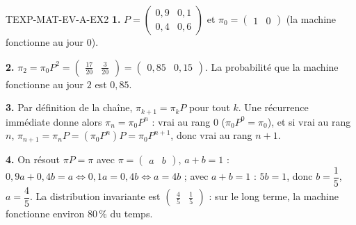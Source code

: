 \begin{corrige}{TEXP-MAT-EV-A-EX2}
\textbf{1.} $P=\begin{pmatrix}0{,}9&0{,}1\\0{,}4&0{,}6\end{pmatrix}$ et $\pi_0=\begin{pmatrix}1&0\end{pmatrix}$ (la machine fonctionne au jour $0$).

\textbf{2.} $\pi_2=\pi_0P^2=\begin{pmatrix}\tfrac{17}{20}&\tfrac{3}{20}\end{pmatrix}=\begin{pmatrix}0{,}85&0{,}15\end{pmatrix}$. La probabilité que la machine fonctionne au jour $2$ est $0{,}85$.

\textbf{3.} Par définition de la chaîne, $\pi_{k+1}=\pi_kP$ pour tout $k$. Une récurrence immédiate donne alors $\pi_n=\pi_0P^n$ : vrai au rang $0$ ($\pi_0P^0=\pi_0$), et si vrai au rang $n$, $\pi_{n+1}=\pi_nP=(\pi_0P^n)P=\pi_0P^{n+1}$, donc vrai au rang $n+1$.

\textbf{4.} On résout $\pi P=\pi$ avec $\pi=\begin{pmatrix}a&b\end{pmatrix}$, $a+b=1$ : $0{,}9a+0{,}4b=a\iff0{,}1a=0{,}4b\iff a=4b$ ; avec $a+b=1$ : $5b=1$, donc $b=\dfrac{1}{5}$, $a=\dfrac{4}{5}$. La distribution invariante est $\begin{pmatrix}\tfrac{4}{5}&\tfrac{1}{5}\end{pmatrix}$ : sur le long terme, la machine fonctionne environ $80\,\%$ du temps.
\end{corrige}

